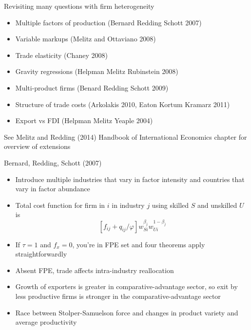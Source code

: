 \documentclass[10pt,notes=hide]{beamer}
\begin{document}
\begin{frame}{Revisiting many questions with firm heterogeneity }
\begin{itemize}
\item Multiple factors of production (Bernard Redding Schott 2007)
\item Variable markups (Melitz and Ottaviano 2008)
\item Trade elasticity (Chaney 2008)
\item Gravity regressions (Helpman Melitz Rubinstein 2008)
\item Multi-product firms (Benard Redding Schott 2009)
\item Structure of trade costs (Arkolakis 2010, Eaton Kortum Kramarz 2011)
\item Export vs FDI (Helpman Melitz Yeaple 2004)
\end{itemize}
See Melitz and Redding (2014) Handbook of International Economics chapter for overview of extensions
\end{frame}
\begin{frame}{Bernard, Redding, Schott (2007)}
\begin{itemize}
	\item Introduce multiple industries that vary in factor intensity and countries that vary in factor abundance
	\item Total cost function for firm in $i$ in industry $j$ using skilled $S$ and unskilled $U$ is
	$$
	\left[f_{ij}+q_{ij}/\varphi\right] w_{Si}^{\beta_j} w_{Ui}^{1-\beta_j}
	$$
	\item If $\tau=1$ and $f_x=0$, you're in FPE set and four theorems apply straightforwardly
	\item Absent FPE, trade affects intra-industry reallocation
	\item Growth of exporters is greater in comparative-advantage sector,
	so exit by less productive firms is stronger in the comparative-advantage sector
	\item Race between Stolper-Samuelson force and changes in product variety and average productivity
\end{itemize}
\end{frame}
\end{document}
